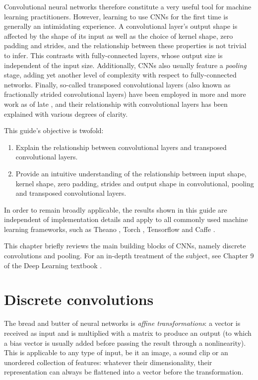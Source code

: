 \documentclass[notitlepage]{report}
\begin{document}
Convolutional neural networks therefore constitute a very useful tool for
machine learning practitioners. However, learning to use CNNs for the first time
is generally an intimidating experience. A convolutional layer's output shape is
affected by the shape of its input as well as the choice of kernel shape, zero
padding and strides, and the relationship between these properties is not
trivial to infer. This contrasts with fully-connected layers, whose output size
is independent of the input size. Additionally, CNNs also usually feature a {\em
pooling\/} stage, adding yet another level of complexity with respect to
fully-connected networks.  Finally, so-called transposed convolutional layers
(also known as fractionally strided convolutional layers) have been employed in
more and more work as of late \citep{zeiler2011adaptive,zeiler2014visualizing,
long2015fully,radford2015unsupervised,visin15,im2016generating}, and their
relationship with convolutional layers has been explained with various degrees
of clarity.

This guide's objective is twofold:

\begin{enumerate}
    \item Explain the relationship between convolutional layers and transposed
        convolutional layers.
    \item Provide an intuitive understanding of the relationship between input
        shape, kernel shape, zero padding, strides and output shape in
        convolutional, pooling and transposed convolutional layers.
\end{enumerate}

In order to remain broadly applicable, the results shown in this guide are
independent of implementation details and apply to all commonly used machine
learning frameworks, such as Theano
\citep{bergstra2010theano,bastien2012theano}, Torch \citep{collobert2011torch7},
Tensorflow \citep{abaditensorflow} and Caffe \citep{jia2014caffe}.

This chapter briefly reviews the main building blocks of CNNs, namely discrete
convolutions and pooling. For an in-depth treatment of the subject, see Chapter
9 of the Deep Learning textbook \citep{Goodfellow-et-al-2016-Book}.

\section{Discrete convolutions}

The bread and butter of neural networks is \emph{affine transformations}: a
vector is received as input and is multiplied with a matrix to produce an
output (to which a bias vector is usually added before passing the result
through a nonlinearity). This is applicable to any type of input, be it an
image, a sound clip or an unordered collection of features: whatever their
dimensionality, their representation can always be flattened into a vector
before the transformation.
\end{document}
